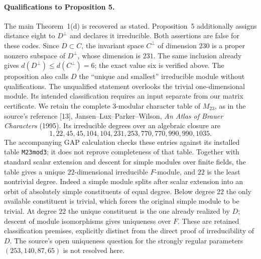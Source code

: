 \documentclass[11pt]{article}
\begin{document}
\paragraph{Qualifications to Proposition 5.}
The main Theorem~1(d) is recovered as stated. Proposition~5 additionally
assigns distance eight to $D^\perp$ and declares it irreducible. Both
assertions are false for these codes. Since $D\subset C$, the invariant
space $C^\perp$ of dimension $230$ is a proper nonzero subspace of
$D^\perp$, whose dimension is $231$. The same inclusion already gives
$d(D^\perp)\leq d(C^\perp)=6$; the exact value six is verified above.
The proposition also calls $D$ the ``unique and smallest'' irreducible
module without qualifications. The unqualified statement overlooks the
trivial one-dimensional module. Its intended classification requires an
input separate from our matrix certificate. We retain the complete
$3$-modular character table of $M_{23}$, as in the source's reference [13],
Jansen--Lux--Parker--Wilson, \emph{An Atlas of Brauer Characters} (1995).
Its irreducible degrees over an algebraic closure are
\[
 1,22,45,45,104,104,231,253,770,770,990,990,1035.
\]
The accompanying GAP calculation checks these entries against its
installed table \texttt{M23mod3}; it does not reprove completeness of
that table. Together with standard scalar extension and descent for
simple modules over finite fields, the table gives a unique
$22$-dimensional irreducible $F$-module, and $22$ is the least
nontrivial degree. Indeed a simple module splits after scalar extension
into an orbit of absolutely simple constituents of equal degree. Below
degree $22$ the only available constituent is trivial, which forces the
original simple module to be trivial. At degree $22$ the unique
constituent is the one already realized by $D$; descent of module
isomorphisms gives uniqueness over $F$. These are retained
classification premises, explicitly distinct from the direct proof of
irreducibility of $D$. The source's open uniqueness question for the
strongly regular parameters $(253,140,87,65)$ is not resolved here.
\end{document}
